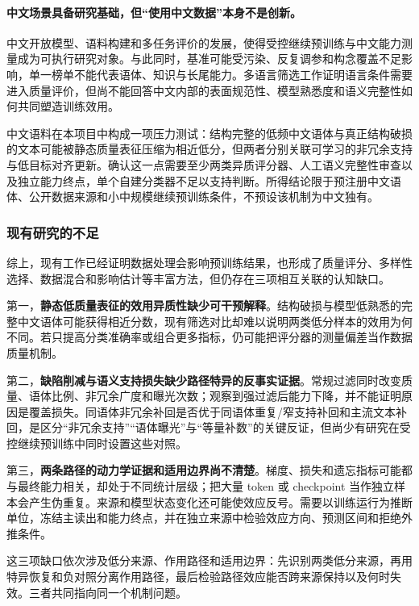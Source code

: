 \paragraph{中文场景具备研究基础，但“使用中文数据”本身不是创新。}

中文开放模型、语料构建和多任务评价的发展，使得受控继续预训练与中文能力测量成为可执行研究对象\cite{baichuanseedsharingthe2024,chatglmafamily2024,cmmlumeasuringmassive2024}。与此同时，基准可能受污染、反复调参和构念覆盖不足影响，单一榜单不能代表语体、知识与长尾能力\cite{inadequaciesoflarge2024}。多语言筛选工作证明语言条件需要进入质量评价\cite{ali2025jql}，但尚不能回答中文内部的表面规范性、模型熟悉度和语义完整性如何共同塑造训练效用。

中文语料在本项目中构成一项压力测试：结构完整的低频中文语体与真正结构破损的文本可能被静态质量表征压缩为相近低分，但两者分别关联可学习的非冗余支持与低目标对齐更新。确认这一点需要至少两类异质评分器、人工语义完整性审查以及独立能力终点，单个自建分类器不足以支持判断。所得结论限于预注册中文语体、公开数据来源和小中规模继续预训练条件，不预设该机制为中文独有。

\subsubsection{现有研究的不足}

综上，现有工作已经证明数据处理会影响预训练结果，也形成了质量评分、多样性选择、数据混合和影响估计等丰富方法，但仍存在三项相互关联的认知缺口。

第一，\textbf{静态低质量表征的效用异质性缺少可干预解释}。结构破损与模型低熟悉的完整中文语体可能获得相近分数，现有筛选对比却难以说明两类低分样本的效用为何不同。若只提高分类准确率或组合更多指标，仍可能把评分器的测量偏差当作数据质量机制。

第二，\textbf{缺陷削减与语义支持损失缺少路径特异的反事实证据}。常规过滤同时改变质量、语体比例、非冗余广度和曝光次数；观察到强过滤后能力下降，并不能证明原因是覆盖损失。同语体非冗余补回是否优于同语体重复/窄支持补回和主流文本补回，是区分“非冗余支持”“语体曝光”与“等量补数”的关键反证，但尚少有研究在受控继续预训练中同时设置这些对照。

第三，\textbf{两条路径的动力学证据和适用边界尚不清楚}。梯度、损失和遗忘指标可能都与最终能力相关，却处于不同统计层级；把大量 token 或 checkpoint 当作独立样本会产生伪重复。来源和模型状态变化还可能使效应反号。需要以训练运行为推断单位，冻结主读出和能力终点，并在独立来源中检验效应方向、预测区间和拒绝外推条件。

这三项缺口依次涉及低分来源、作用路径和适用边界：先识别两类低分来源，再用特异恢复和负对照分离作用路径，最后检验路径效应能否跨来源保持以及何时失效。三者共同指向同一个机制问题。


